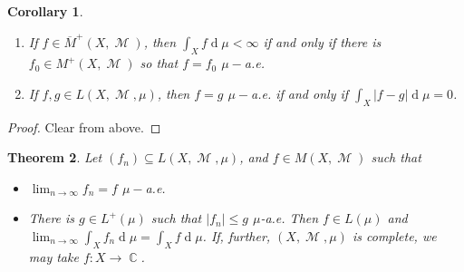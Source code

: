 \documentclass[12pt, a4paper]{memoir}
\DeclareMathOperator{\C}{{\mathbb{C}}}
\newtheorem{theorem}{Theorem}[section]
\newtheorem{corollary}[theorem]{Corollary}
\theoremstyle{nonumberplain}
\newtheorem{proof}{Proof}
\DeclareMathOperator{\M}{\mathcal{M}}
\renewcommand{\d}[1]{\ensuremath{\operatorname{d}\!{#1}}} %
\begin{document}
\begin{corollary}
    \begin{enumerate}
        \item If $f\in\overline{M}^+(X,\M)$, then $\int_Xf\d{\mu}<\infty$ if and only if there is $f_0\in M^+(X,\M)$ so that $f=f_0$ $\mu-$a.e.
        \item If $f,g\in L(X,\M,\mu)$, then $f=g$ $\mu-$a.e. if and only if $\int_X|f-g|\d{\mu}=0$.
    \end{enumerate}
\end{corollary}
\begin{proof}
    Clear from above.
\end{proof}
\begin{theorem}
    Let $(f_n)\subseteq L(X,\M,\mu)$, and $f\in M(X,\M)$ such that
    \begin{itemize}[nolistsep]
        \item $\lim_{n\to\infty} f_n=f$ $\mu-$a.e.
        \item There is $g\in L^+(\mu)$ such that $|f_n|\leq g$ $\mu$-a.e.
            Then $f\in L(\mu)$ and $\lim_{n\to\infty}\int_X f_n\d{\mu}=\int_X f\d{\mu}$.
            If, further, $(X,\M,\mu)$ is complete, we may take $f:X\to\C$.
    \end{itemize}
\end{theorem}
\end{document}
